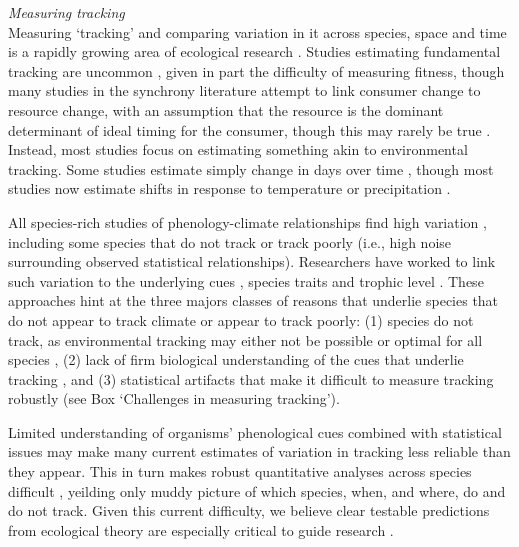 \documentclass[11pt,letterpaper]{article}
\newcommand{\R}[1]{\label{#1}\linelabel{#1}}
\begin{document}
\emph{Measuring tracking}\\
Measuring `tracking' and comparing variation in it across species, space and time is a rapidly growing area of ecological research \citep[e.g.,][]{Cook:2012pnas,fu2015,thackeray2016,cohen2018}. Studies estimating fundamental tracking are uncommon \citep[but see][]{visser2006,charm2008}, given in part the difficulty of measuring fitness, though many studies in the synchrony literature attempt to link consumer change to resource change, with an assumption that the resource is the dominant determinant of ideal timing for the consumer, though this may rarely be true \citep{Singer:2010eb,Johansson2012, reed2013}\R{citeReedagain}.  Instead, most studies focus on estimating something akin to environmental tracking. Some studies estimate simply change in days over time \citep[e.g.,][]{Parmesan:2007tv,kharouba2018}, though most studies now estimate shifts in response to temperature \citep[for example, multiple meta-analyses show plants' spring phenology shifts with spring or annual temperatures 4-6 days/$\degree$C on average across species,][]{Richardson:2006qh,Wolkovich:2012n,thackeray2016} or precipitation \citep{inouye2002,Craine:2012kl}. %

All species-rich studies of phenology-climate relationships find high variation \citep{Cook:2012pnas,thackeray2016}, including some species that do not track or track poorly (i.e., high noise surrounding observed statistical relationships). Researchers have worked to link such variation to the underlying cues \citep[e.g.,][]{Cook:2012pnas}, species traits \citep[e.g.,][]{cohen2018} and trophic level \citep[e.g.,][]{thackeray2016}. These approaches hint at the three majors classes of reasons that underlie species that do not appear to track climate or appear to track poorly: (1) species do not track, as environmental tracking may either not be possible or optimal for all species \citep{simons2011}, (2) lack of firm biological understanding of the cues that underlie tracking \citep{chmura2019}, and (3) statistical artifacts that make it difficult to measure tracking robustly (see Box `Challenges in measuring tracking'). 

Limited understanding of organisms' phenological cues combined with statistical issues may make many current estimates of variation in tracking less reliable than they appear. This in turn makes robust quantitative analyses across species difficult \citep{brown2016,kharouba2018}, yeilding only muddy picture of which species, when, and where, do and do not track. Given this current difficulty, we believe clear testable predictions from ecological theory are especially critical to guide research \citep{Smaldino2016}.  
\end{document}
